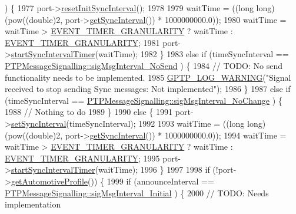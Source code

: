 \begin{DoxyCode}
{{{      ) \{
1977         port->\hyperlink{class_common_port_a7e4b6dfc0822ebebb0874ed2bdd91b10}{resetInitSyncInterval}();
1978 
1979         waitTime = ((\textcolor{keywordtype}{long} long) (pow((\textcolor{keywordtype}{double})2, port->\hyperlink{class_common_port_a963da67f8dd0b8c72bd19ca91c3ce00d}{getSyncInterval}()) *  1000000000.0));
1980         waitTime = waitTime > \hyperlink{avbts__clock_8hpp_a9fc7849128814495c7dccd06d5343baa}{EVENT\_TIMER\_GRANULARITY} ? waitTime : 
      \hyperlink{avbts__clock_8hpp_a9fc7849128814495c7dccd06d5343baa}{EVENT\_TIMER\_GRANULARITY};
1981         port->\hyperlink{class_common_port_a2033d126c19548eb5ada2d623667e1f2}{startSyncIntervalTimer}(waitTime);
1982     \}
1983     \textcolor{keywordflow}{else} \textcolor{keywordflow}{if} (timeSyncInterval == \hyperlink{class_p_t_p_message_signalling_afcb2a19f3190abbb589f24267c8cd636}{PTPMessageSignalling::sigMsgInterval\_NoSend}
      ) \{
1984         \textcolor{comment}{// TODO: No send functionality needs to be implemented.}
1985         \hyperlink{gptp__log_8hpp_af167ce4fe92c399b212449dfb071a3f5}{GPTP\_LOG\_WARNING}(\textcolor{stringliteral}{"Signal received to stop sending Sync messages: Not implemented"});
1986     \}
1987     \textcolor{keywordflow}{else} \textcolor{keywordflow}{if} (timeSyncInterval == \hyperlink{class_p_t_p_message_signalling_af6d2439496842acecd33cf27e79e8a04}{PTPMessageSignalling::sigMsgInterval\_NoChange}
      ) \{
1988         \textcolor{comment}{// Nothing to do}
1989     \}
1990     \textcolor{keywordflow}{else} \{
1991         port->\hyperlink{class_common_port_a0aff2cd89fbc637b4b883a47728f94df}{setSyncInterval}(timeSyncInterval);
1992 
1993         waitTime = ((\textcolor{keywordtype}{long} long) (pow((\textcolor{keywordtype}{double})2, port->\hyperlink{class_common_port_a963da67f8dd0b8c72bd19ca91c3ce00d}{getSyncInterval}()) *  1000000000.0));
1994         waitTime = waitTime > \hyperlink{avbts__clock_8hpp_a9fc7849128814495c7dccd06d5343baa}{EVENT\_TIMER\_GRANULARITY} ? waitTime : 
      \hyperlink{avbts__clock_8hpp_a9fc7849128814495c7dccd06d5343baa}{EVENT\_TIMER\_GRANULARITY};
1995         port->\hyperlink{class_common_port_a2033d126c19548eb5ada2d623667e1f2}{startSyncIntervalTimer}(waitTime);
1996     \}
1997 
1998     \textcolor{keywordflow}{if} (!port->\hyperlink{class_common_port_ad8dc4b5a985b466538d6805970eb0176}{getAutomotiveProfile}()) \{
1999         \textcolor{keywordflow}{if} (announceInterval == \hyperlink{class_p_t_p_message_signalling_aa46796faa0e40d6a5c22d0c2ba50d991}{PTPMessageSignalling::sigMsgInterval\_Initial}
      ) \{
2000             \textcolor{comment}{// TODO: Needs implementation}
}}}
\end{DoxyCode}
